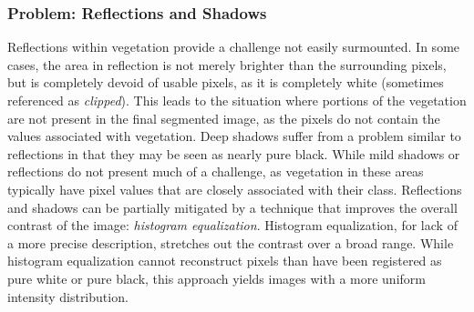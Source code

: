 \documentclass[letterpaper]{article}
\begin{document}
{{\subsubsection{Problem: Reflections and Shadows}
Reflections within vegetation provide a challenge not easily surmounted.  In some cases, the area in reflection is not merely brighter than the surrounding pixels, but is completely devoid of usable pixels, as it is completely white (sometimes referenced as \textit{clipped}). This leads to the situation where portions of the vegetation are not present in the final segmented image, as the pixels do not contain the values associated with vegetation.  Deep shadows suffer from a problem similar to reflections in that they may be seen as nearly pure black. While mild shadows or reflections do not present much of a challenge, as vegetation in these areas typically have pixel values that are closely associated with their class. Reflections and shadows can be partially mitigated by a technique that improves the overall contrast of the image: \textit{histogram equalization}. Histogram equalization, for lack of a more precise description, stretches out the contrast over a broad range. While histogram equalization cannot reconstruct pixels than have been registered as pure white or pure black, this approach yields images with a more uniform intensity distribution.


}}
\end{document}
